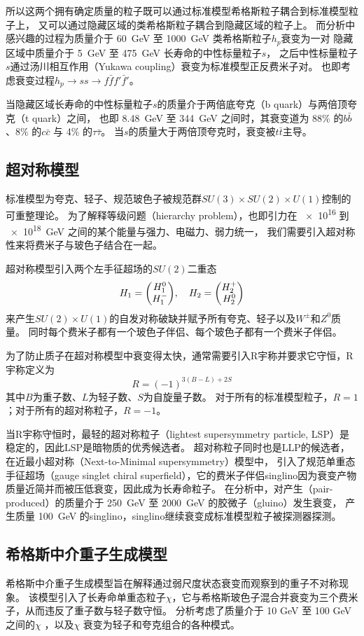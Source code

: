 所以这两个拥有确定质量的粒子既可以通过标准模型希格斯粒子耦合到标准模型粒子上，
又可以通过隐藏区域的类希格斯粒子耦合到隐藏区域的粒子上。
而分析中感兴趣的过程为质量介于 \SI{60}{GeV} 至 \SI{1000}{GeV} 类希格斯粒子$h_p$衰变为一对
隐藏区域中质量介于 \SI{5}{GeV} 至 \SI{475}{GeV} 长寿命的中性标量粒子$s$，
之后中性标量粒子$s$通过汤川相互作用（Yukawa coupling）衰变为标准模型正反费米子对。
也即考虑衰变过程$h_p \rightarrow ss \rightarrow f \bar{f} f' \bar{f}'$。

当隐藏区域长寿命的中性标量粒子$s$的质量介于两倍底夸克（b quark）与两倍顶夸克（t quark）之间，
也即 \SI{8.48}{GeV} 至 \SI{344}{GeV} 之间时，其衰变道为 88\% 的$b \bar{b}$、8\% 的$c \bar{c}$ 与 4\% 的$\tau \bar{\tau}$。
当$s$的质量大于两倍顶夸克时，衰变被$t \bar{t}$主导。


\subsection{超对称模型}
标准模型为夸克、轻子、规范玻色子被规范群$SU(3)\times SU(2) \times U(1)$控制的可重整理论。
为了解释等级问题（hierarchy problem），也即引力在 \num{e16} 到 \SI{e18}{GeV} 之间的某个能量与强力、电磁力、弱力统一，
我们需要引入超对称性来将费米子与玻色子结合在一起。

超对称模型引入两个左手征超场的$SU(2)$二重态
$$H_1 = \mqty(H_1^0 \\ H_1^-) \qc H_2 = \mqty(H_2^+ \\ H_2^0) $$
来产生$SU(2) \times U(1)$的自发对称破缺并赋予所有夸克、轻子以及$W^\pm$和$Z^0$质量。
同时每个费米子都有一个玻色子伴侣、每个玻色子都有一个费米子伴侣。
\cite{QFT_Weinberg}

为了防止质子在超对称模型中衰变得太快，通常需要引入R宇称并要求它守恒，R宇称定义为
\begin{equation}
    R = (-1)^{3(B-L)+2S}
\end{equation}
其中$B$为重子数、$L$为轻子数、$S$为自旋量子数。
对于所有的标准模型粒子，$R=1$；对于所有的超对称粒子，$R=-1$。
\cite{SUSY_ATLAS}

当R宇称守恒时，最轻的超对称粒子（lightest supersymmetry particle, LSP）是稳定的，因此LSP是暗物质的优秀候选者。
超对称粒子同时也是LLP的候选者，在近最小超对称（Next-to-Minimal supersymmetry）模型中，
引入了规范单重态手征超场（gauge singlet chiral superfield），它的费米子伴侣singlino因为衰变产物质量近简并而被压低衰变，因此成为长寿命粒子。
\cite{singlino}
在分析中，对产生（pair-produced）的质量介于 \SI{250}{GeV} 至 \SI{2000}{GeV} 的胶微子（gluino）发生衰变，
产生质量 \SI{100}{GeV} 的singlino，singlino继续衰变成标准模型粒子被探测器探测。


\subsection{希格斯中介重子生成模型}
希格斯中介重子生成模型旨在解释通过弱尺度状态衰变而观察到的重子不对称现象。
该模型引入了长寿命单重态粒子$\chi$，它与希格斯玻色子混合并衰变为三个费米子，从而违反了重子数与轻子数守恒。
分析考虑了质量介于 10 GeV 至 100 GeV 之间的$\chi$ ，以及$\chi$ 衰变为轻子和夸克组合的各种模式。

